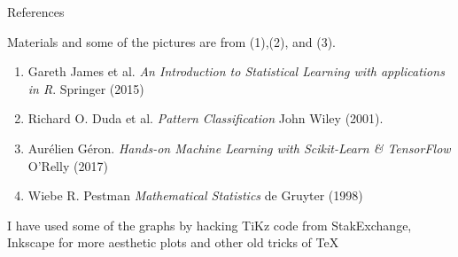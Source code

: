\documentclass{beamer}
\begin{document}
\begin{frame}{References}
	
	Materials and some of the pictures are from (1),(2), and (3).
	\begin{enumerate}
		\item Gareth James et al. {\it An Introduction to Statistical Learning with applications in R}. Springer (2015)
		\item Richard O. Duda et al. {\it Pattern Classification} John Wiley (2001). 
		\item Aur\'elien G\'eron. {\it Hands-on Machine Learning with Scikit-Learn \& TensorFlow} O'Relly (2017)
		\item Wiebe R. Pestman {\it Mathematical Statistics} de Gruyter (1998)
	\end{enumerate}	
	
	I have used some of the graphs by hacking TiKz code from StakExchange, Inkscape for more aesthetic plots and other old tricks of \TeX
\end{frame}	
\end{document}
